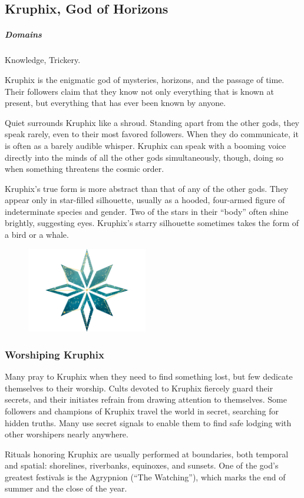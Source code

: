         \pagebreak

\subsection*{Kruphix, God of Horizons} \label{ssec::kruphix}
    \subparagraph{Domains} Knowledge, Trickery.

    Kruphix is the enigmatic god of mysteries, horizons, and the passage of time.
    Their followers claim that they know not only everything that is known at present, but everything that has ever been known by anyone.

    Quiet surrounds Kruphix like a shroud.
    Standing apart from the other gods, they speak rarely, even to their most favored followers.
    When they do communicate, it is often as a barely audible whisper.
    Kruphix can speak with a booming voice directly into the minds of all the other gods simultaneously, though, doing so when something threatens the cosmic order.

    Kruphix's true form is more abstract than that of any of the other gods.
    They appear only in star-filled silhouette, usually as a hooded, four-armed figure of indeterminate species and gender.
    Two of the stars in their ``body'' often shine brightly, suggesting eyes.
    Kruphix's starry silhouette sometimes takes the form of a bird or a whale.

    \begin{figure}[b]
        \centering
        \includegraphics[width=0.47\textwidth]{02viphoger/img/10s_kruphix.png}
    \end{figure}

    \subsubsection{Worshiping Kruphix}
        Many pray to Kruphix when they need to find something lost, but few dedicate themselves to their worship.
        Cults devoted to Kruphix fiercely guard their secrets, and their initiates refrain from drawing attention to themselves.
        Some followers and champions of Kruphix travel the world in secret, searching for hidden truths.
        Many use secret signals to enable them to find safe lodging with other worshipers nearly anywhere.

        Rituals honoring Kruphix are usually performed at boundaries, both temporal and spatial: shorelines, riverbanks, equinoxes, and sunsets.
        One of the god's greatest festivals is the Agrypnion (``The Watching''), which marks the end of summer and the close of the year.

\pagebreak
